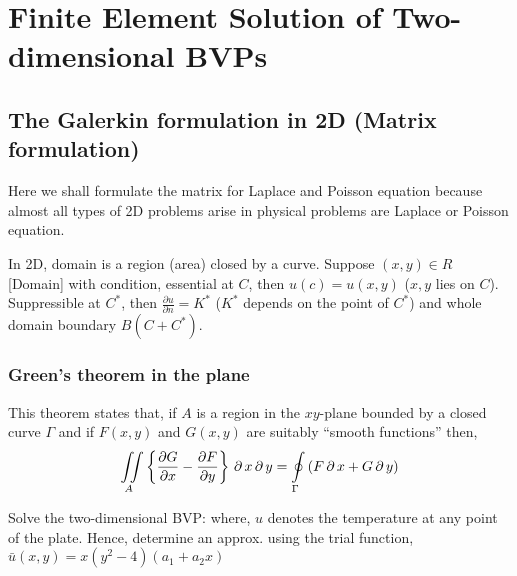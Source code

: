 \documentclass[../main-sheet.tex]{subfiles}
\begin{document}
\chapter{Finite Element Solution of Two-dimensional BVPs}
\section{The Galerkin formulation in 2D (Matrix formulation)}
Here we shall formulate the matrix for Laplace and Poisson equation because almost all types of 2D problems arise in physical problems are Laplace or Poisson equation.

In 2D, domain is a region (area) closed by a curve. Suppose \((x,y) \in R \) [Domain] with condition, essential at \(C\), then \(u(c)=u(x,y)\) (\(x,y\) lies on \(C\)). Suppressible at \(C^*\), then \(\frac{\partial u }{\partial n }=K^*\) (\(K^*\) depends on the point of \(C^*\)) and whole domain boundary \(B(C+C^*)\).

\subsection{Green's theorem in the plane}
This theorem states that, if \(A \) is a region in the \(xy \)-plane bounded by a closed curve \(\Gamma\) and if \(F(x,y )\) and \(G(x,y )\) are suitably ``smooth functions'' then,
\[\iint\limits_A \left\{ \frac{\partial G }{\partial x}-\frac{\partial F }{\partial y} \right\}\,\partial\, x\,\partial\, y=\oint\limits_\Gamma \left( F\,\partial\, x+G\,\partial\, y  \right)\]
\begin{prob}
    Solve the two-dimensional BVP:
    where, \(u \) denotes the temperature at any point of the plate. Hence, determine an approx. using the trial function, \(\bar{u}(x,y)=x(y^2-4)(a_1+a_2x)\)
\end{prob}
\end{document}
